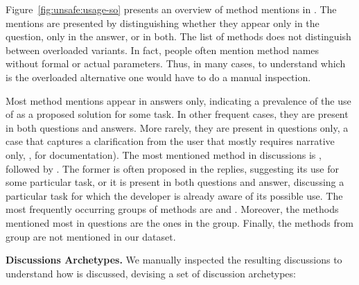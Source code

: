 Figure~\ref{fig:unsafe:usage-so} presents an overview of \smu{} method mentions in \stackoverflow{}.
The mentions are presented by distinguishing whether they appear only in the question,
only in the answer, or in both.
The list of methods does not distinguish between overloaded variants.
In fact, people often mention method names without formal or actual parameters.
Thus, in many cases, to understand which is the overloaded alternative one would have to do a manual inspection. 

Most method mentions appear in answers only,
indicating a prevalence of the use of \smu{} as a proposed solution for some task.
In other frequent cases, they are present in both questions and answers.
More rarely, they are present in questions only,
a case that captures a clarification from the user that mostly requires narrative only,
\eg{}, for documentation).
The most mentioned method in \stackoverflow{} discussions is ,
followed by .
The former is often proposed in the replies,
suggesting its use for some particular task,
or it is present in both questions and answer,
discussing a particular task for which the developer is already aware of its possible use.
The most frequently occurring groups of methods are  and .
Moreover, the methods mentioned most in questions are the ones in the  group.
Finally, the methods from  group are not mentioned in our dataset.

{ \bfseries Discussions Archetypes. } 
We manually inspected the resulting discussions to understand how \smu{} is discussed, devising a set of discussion archetypes:

